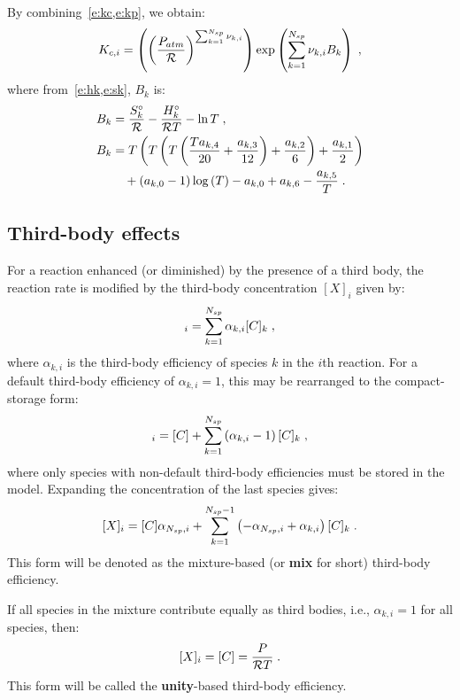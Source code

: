 \documentclass[12pt,number,sort&compress]{elsarticle}
\begin{document}
By combining~\cref{e:kc,e:kp}, we obtain:
\begin{equation}
 \label{e:kc_in_kp}
 {K_{c, i}} = \left(\left(\frac{P_{atm}}{\Ru/}\right)^{\sum_{k=1}^{\ns/} \nu_{k,i}}\right) \operatorname{exp}\left({\sum_{k=1}^{\ns/} \nu_{k,i} B_{k}}\right)\;,
\end{equation}
where from~\cref{e:hk,e:sk}, $B_k$ is:
\begin{align}
 \label{e:Bk}
 B_{k} &= \frac{S^{\circ}_k}{\Ru/} - \frac{H^{\circ}_k}{\Ru/ T} - \ln{T} \nonumber\; , \\
 B_{k} &= T \left(T \left(T \left(\frac{T a_{k,4}}{20} + \frac{a_{k,3}}{12}\right) + \frac{a_{k,2}}{6}\right) + \frac{a_{k,1}}{2}\right) \nonumber \\
       & \quad + \left(a_{k,0} - 1\right) \log{\left (T \right )} - a_{k,0} + a_{k,6} - \frac{a_{k,5}}{T} \;.
\end{align}

\subsection{Third-body effects}
\label{s:thdbody}

For a reaction enhanced (or diminished) by the presence of a third body, the reaction rate is modified by the third-body concentration $[X]_i$ given by:
\begin{equation}
[X]_{i} = \sum_{k=1}^{\ns/} \alpha_{k,i} [C]_{k} \;,
\end{equation}
where $\alpha_{k,i}$ is the third-body efficiency of species $k$ in the $i$th reaction.
For a default third-body efficiency of $\alpha_{k,i} = 1$, this may be rearranged to the compact-storage form:
\begin{equation}
 [X]_{i} = [C] + \sum_{k=1}^{\ns/} \left(\alpha_{k,i} - 1\right) [C]_{k} \;,
\end{equation}
where only species with non-default third-body efficiencies must be stored in the model.
Expanding the concentration of the last species gives:
\begin{equation}
\label{e:thd_mix}
 [X]_{i}=[C] \alpha_{\ns/,i} + \sum_{k=1}^{\ns/  - 1} \left(- \alpha_{\ns/,i} + \alpha_{k,i}\right) [C]_{k}\;.
\end{equation}
This form will be denoted as the mixture-based (or \textbf{mix} for short) third-body efficiency.

If all species in the mixture contribute equally as third bodies, i.e., $\alpha_{k,i} = 1$ for all species, then:
\begin{equation}
\label{e:thd_unity}
 [X]_{i} = [C] = \frac{P}{\Ru/ T} \;.
\end{equation}
This form will be called the \textbf{unity}-based third-body efficiency.
\end{document}
